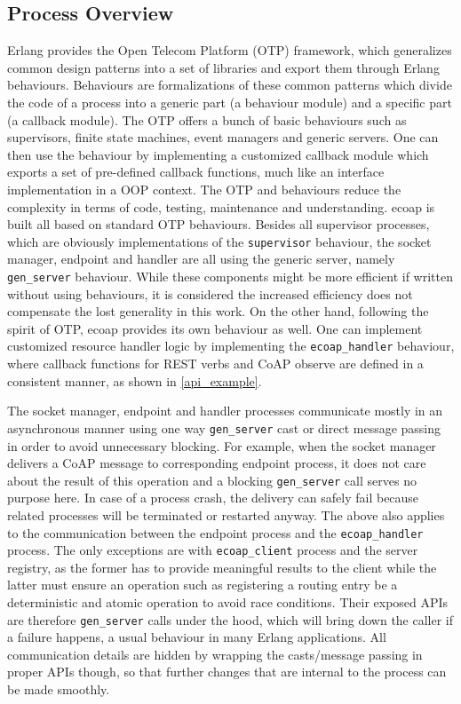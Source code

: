 \subsection{Process Overview}

Erlang provides the Open Telecom Platform (OTP) framework, which generalizes common design patterns into a set of libraries and export them through Erlang behaviours. Behaviours are formalizations of these common patterns which divide the code of a process into a generic part (a behaviour module) and a specific part (a callback module). The OTP offers a bunch of basic behaviours such as supervisors, finite state machines, event managers and generic servers. One can then use the behaviour by implementing a customized callback module which exports a set of pre-defined callback functions, much like an interface implementation in a OOP context. The OTP and behaviours reduce the complexity in terms of code, testing, maintenance and understanding. ecoap is built all based on standard OTP behaviours. Besides all supervisor processes, which are obviously implementations of the \verb|supervisor| behaviour, the socket manager, endpoint and handler are all using the generic server, namely \verb|gen_server| behaviour. While these components might be more efficient if written without using behaviours, it is considered the increased efficiency does not compensate the lost generality in this work. On the other hand, following the spirit of OTP, ecoap provides its own behaviour as well. One can implement customized resource handler logic by implementing the \verb|ecoap_handler| behaviour, where callback functions for REST verbs and CoAP observe are defined in a consistent manner, as shown in \autoref{api_example}.

The socket manager, endpoint and handler processes communicate mostly in an asynchronous manner using one way \verb|gen_server| cast or direct message passing in order to avoid unnecessary blocking. For example, when the socket manager delivers a CoAP message to corresponding endpoint process, it does not care about the result of this operation and a blocking \verb|gen_server| call serves no purpose here. In case of a process crash, the delivery can safely fail because related processes will be terminated or restarted anyway. The above also applies to the communication between the endpoint process and the \verb|ecoap_handler| process. The only exceptions are with \verb|ecoap_client| process and the server registry, as the former has to provide meaningful results to the client while the latter must ensure an operation such as registering a routing entry be a deterministic and atomic operation to avoid race conditions. Their exposed APIs are therefore \verb|gen_server| calls under the hood, which will bring down the caller if a failure happens, a usual behaviour in many Erlang applications. All communication details are hidden by wrapping the casts/message passing in proper APIs though, so that further changes that are internal to the process can be made smoothly. 

